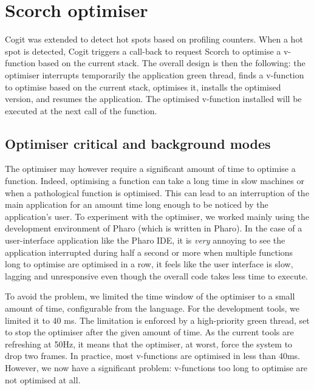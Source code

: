 \documentclass[a4paper,12pt,twoside]{../includes/ThesisStyle}
\begin{document}

\section{Scorch optimiser}

Cogit was extended to detect hot spots based on profiling counters. When a hot spot is detected, Cogit triggers a call-back to request Scorch to optimise a v-function based on the current stack. The overall design is then the following: the optimiser interrupts temporarily the application green thread, finds a v-function to optimise based on the current stack, optimises it, installs the optimised version, and resumes the application. The optimised v-function installed will be executed at the next call of the function.

\subsection{Optimiser critical and background modes}

The optimiser may however require a significant amount of time to optimise a function. Indeed, optimising a function can take a long time in slow machines or when a pathological function is optimised. This can lead to an interruption of the main application for an amount time long enough to be noticed by the application's user. To experiment with the optimiser, we worked mainly using the development environment of Pharo (which is written in Pharo). In the case of a user-interface application like the Pharo IDE, it is \emph{very} annoying to see the application interrupted during half a second or more when multiple functions long to optimise are optimised in a row, it feels like the user interface is slow, lagging and unresponsive even though the overall code takes less time to execute.

To avoid the problem, we limited the time window of the optimiser to a small amount of time, configurable from the language. For the development tools, we limited it to 40 ms. The limitation is enforced by a high-priority green thread, set to stop the optimiser after the given amount of time. As the current tools are refreshing at 50Hz, it means that the optimiser, at worst, force the system to drop two frames. In practice, most v-functions are optimised in less than 40ms. However, we now have a significant problem: v-functions too long to optimise are not optimised at all.
\end{document}
